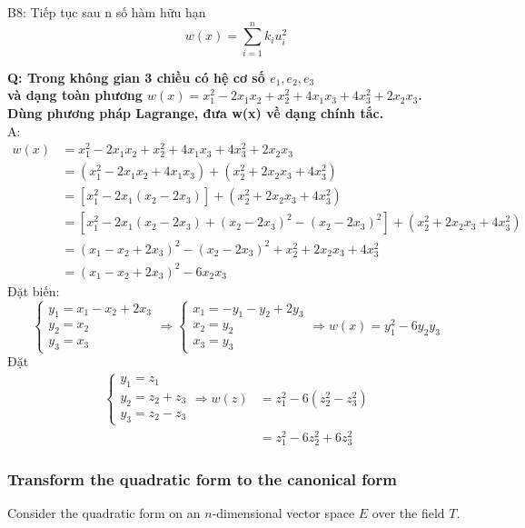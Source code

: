 B8: Tiếp tục sau n số hàm hữu hạn 
\begin{equation*}
    w(x) = \sum_{i=1}^n k_iu_i^2
\end{equation*}

\textbf{Q: Trong không gian 3 chiều có hệ cơ số $e_1, e_2, e_3$\\
 và dạng toàn phương $w(x) = x_1^2 - 2x_1x_2 + x_2^2 + 4x_1x_3 + 4x_3^2 + 2x_2x_3$.\\
 Dùng phương pháp Lagrange, đưa w(x) về dạng chính tắc.}\\
A:\begin{align*}
    w(x) &= x_1^2 - 2x_1x_2 + x_2^2 + 4x_1x_3 + 4x_3^2 + 2x_2x_3\\
    &= (x_1^2 - 2x_1x_2 + 4x_1x_3) + (x_2^2 + 2x_2x_3 + 4x_3^2)\\
    &= [x_1^2 - 2x_1(x_2 - 2x_3)] + (x_2^2 + 2x_2x_3 + 4x_3^2)\\
    &= [x_1^2 - 2x_1(x_2 - 2x_3) + (x_2 - 2x_3)^2 - (x_2 - 2x_3)^2] + (x_2^2 + 2x_2x_3 + 4x_3^2)\\
    &= (x_1 - x_2 + 2x_3)^2 - (x_2 - 2x_3)^2 + x_2^2 + 2x_2x_3 + 4x_3^2\\ 
    &= (x_1 - x_2 + 2x_3)^2 - 6x_2x_3
\end{align*}
Đặt biến:
\begin{equation*}
    \begin{cases}
        y_1 = x_1 - x_2 + 2x_3\\
        y_2 = x_2\\
        y_3 = x_3
    \end{cases}
    \Rightarrow
    \begin{cases}
        x_1 = -y_1 - y_2 + 2y_3\\
        x_2 = y_2\\
        x_3 = y_3
    \end{cases}
    \Rightarrow
    w(x) = y_1^2 - 6y_2y_3
\end{equation*}
Đặt
\begin{align*}
    \begin{cases}
        y_1 = z_1\\
        y_2 = z_2+z_3\\
        y_3 = z_2-z_3
    \end{cases}
    \Rightarrow
        w(z) &= z_1^2 - 6(z_2^2 - z_3^2)\\
        &= z_1^2 - 6z_2^2 + 6z_3^2
\end{align*}

\subsubsection{Transform the quadratic form to the canonical form}
Consider the quadratic form on an $n$-dimensional vector space $E$ over the field $T$.

